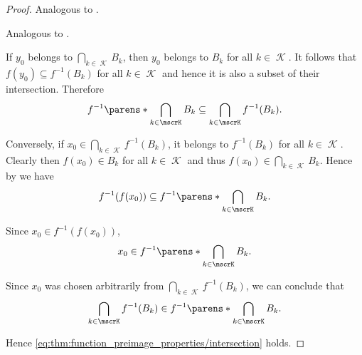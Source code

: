 \begin{proof}
   Analogous to .

   Analogous to .

   If \( y_0 \) belongs to \( \bigcap_{k \in \mscrK} B_k \), then \( y_0 \) belongs to \( B_k \) for all \( k \in \mscrK \). It follows that \( f(y_0) \subseteq f^{-1}(B_k) \) for all \( k \in \mscrK \) and hence it is also a subset of their intersection. Therefore
  \begin{equation*}
    f^{-1} \parens*{ \bigcap_{k \in \mscrK} B_k } \subseteq \bigcap_{k \in \mscrK} f^{-1}(B_k).
  \end{equation*}

  Conversely, if \( x_0 \in \bigcap_{k \in \mscrK} f^{-1}(B_k) \), it belongs to \( f^{-1}(B_k) \) for all \( k \in \mscrK \). Clearly then \( f(x_0) \in B_k \) for all \( k \in \mscrK \) and thus \( f(x_0) \in \bigcap_{k \in \mscrK} B_k \). Hence by  we have
  \begin{equation*}
    f^{-1}(f(x_0))
    \subseteq
    f^{-1}\parens*{ \bigcap_{k \in \mscrK} B_k }.
  \end{equation*}

  Since \( x_0 \in f^{-1}(f(x_0)) \),
  \begin{equation*}
    x_0 \in f^{-1}\parens*{ \bigcap_{k \in \mscrK} B_k }.
  \end{equation*}

  Since \( x_0 \) was chosen arbitrarily from \( \bigcap_{k \in \mscrK} f^{-1}(B_k) \), we can conclude that
  \begin{equation*}
    \bigcap_{k \in \mscrK} f^{-1}(B_k) \in f^{-1}\parens*{ \bigcap_{k \in \mscrK} B_k }.
  \end{equation*}

  Hence \eqref{eq:thm:function_preimage_properties/intersection} holds.


\end{proof}

